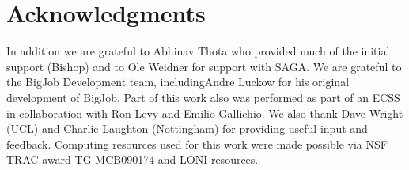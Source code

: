 \documentclass{sig-alternate}
\begin{document}
\section{Acknowledgments}
In addition we are grateful to Abhinav Thota who provided much of the
initial support (Bishop) and to Ole Weidner for support with SAGA. We
are grateful to the BigJob Development team, includingAndre Luckow for
his original development of BigJob. Part of this work also was
performed as part of an ECSS in collaboration with Ron Levy and Emilio
Gallichio. We also thank Dave Wright (UCL) and Charlie Laughton
(Nottingham) for providing useful input and feedback. Computing
resources used for this work were made possible via NSF TRAC award
TG-MCB090174 and LONI resources.  

\end{document}
